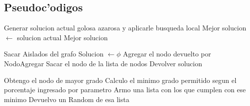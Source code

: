 \subsection{Pseudoc'odigos}

\begin{algorithmic}[1]
	\STATE Generar solucion actual golosa azarosa y aplicarle busqueda local
		\STATE Mejor solucion $\leftarrow$ solucion actual 
	\ENDIF
\ENDWHILE
\RETURN Mejor solucion
\end{algorithmic}

\vspace{2em}

\begin{algorithmic}[1]
\STATE Sacar Aislados del grafo
\STATE Solucion $\leftarrow \phi$
	\STATE Agregar el nodo devuelto por NodoAgregar
	\STATE Sacar el nodo de la lista de nodos
\ENDWHILE
\STATE Devolver solucion
\end{algorithmic}
	
\vspace{2em}
	
\begin{algorithmic}[1]
\STATE Obtengo el nodo de mayor grado
\STATE Calculo el minimo grado permitido segun el porcentaje ingresado por parametro
\STATE Armo una lista con los que cumplen con ese minimo
\STATE Devuelvo un Random de esa lista
\end{algorithmic}
